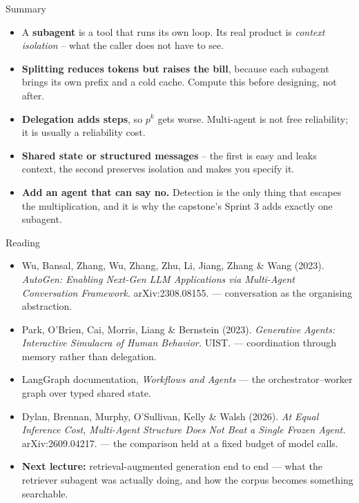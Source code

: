 \begin{frame}{Summary}
\begin{itemize}
  \item A \textbf{subagent} is a tool that runs its own loop. Its real product is \emph{context isolation} -- what the caller does not have to see.
  \pause
  \item \textbf{Splitting reduces tokens but raises the bill}, because each subagent brings its own prefix and a cold cache. Compute this before designing, not after.
  \pause
  \item \textbf{Delegation adds steps}, so $p^{k}$ gets worse. Multi-agent is not free reliability; it is usually a reliability cost.
  \pause
  \item \textbf{Shared state or structured messages} -- the first is easy and leaks context, the second preserves isolation and makes you specify it.
  \pause
  \item \textbf{Add an agent that can say no.} Detection is the only thing that escapes the multiplication, and it is why the capstone's Sprint 3 adds exactly one subagent.
\end{itemize}
\end{frame}

\begin{frame}{Reading}
\begin{itemize}
  \item Wu, Bansal, Zhang, Wu, Zhang, Zhu, Li, Jiang, Zhang \& Wang (2023). \textit{AutoGen: Enabling Next-Gen LLM Applications via Multi-Agent Conversation Framework.} arXiv:2308.08155. --- conversation as the organising abstraction.
  \pause
  \item Park, O'Brien, Cai, Morris, Liang \& Bernstein (2023). \textit{Generative Agents: Interactive Simulacra of Human Behavior.} UIST. --- coordination through memory rather than delegation.
  \pause
  \item LangGraph documentation, \textit{Workflows and Agents} --- the orchestrator--worker graph over typed shared state.
  \pause
  \item Dylan, Brennan, Murphy, O'Sullivan, Kelly \& Walsh (2026). \textit{At Equal Inference Cost, Multi-Agent Structure Does Not Beat a Single Frozen Agent.} arXiv:2609.04217. --- the comparison held at a fixed budget of model calls.
  \pause
  \item \textbf{Next lecture:} retrieval-augmented generation end to end --- what the retriever subagent was actually doing, and how the corpus becomes something searchable.
\end{itemize}
\end{frame}
